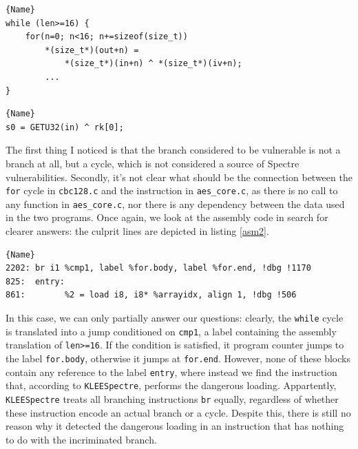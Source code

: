 \documentclass[12pt,a4paper]{book}
\theoremstyle{definition}
\begin{document}
	\lstset{
		numbers=left
	}
	\begin{minipage}{.7\textwidth}
		\begin{lstlisting}[caption=\texttt{cbc128.c}, firstnumber=92, label=cbc128]{Name}
while (len>=16) {
	for(n=0; n<16; n+=sizeof(size_t))
		*(size_t*)(out+n) = 
			*(size_t*)(in+n) ^ *(size_t*)(iv+n);
		...
}
		\end{lstlisting}
	\end{minipage}

	\begin{minipage}{.5\textwidth}
		\begin{lstlisting}[caption=\texttt{aes\_core.c}, firstnumber=797, label=aes-core2]{Name}
s0 = GETU32(in) ^ rk[0];
		\end{lstlisting}
	\end{minipage}
	\vspace{3mm}

	The first thing I noticed is that the branch considered to be vulnerable is not a branch at all, but a cycle, which is not considered a source of Spectre vulnerabilities. Secondly, it's not clear what should be the connection between the \texttt{for} cycle in \texttt{cbc128.c} and the instruction in \texttt{aes\_core.c}, as there is no call to any function in \texttt{aes\_core.c}, nor there is any dependency between the data used in the two programs. Once again, we look at the assembly code in search for clearer answers: the culprit lines are depicted in listing \ref{asm2}.
	
	\lstset{
		numbers=none
	}
	\begin{minipage}{.9\textwidth}
	\begin{lstlisting}[caption=\texttt{assembly.ll} (for AES-CBC), label=asm2]{Name}
2202: br i1 %cmp1, label %for.body, label %for.end, !dbg !1170
825:  entry:  
861:  		%2 = load i8, i8* %arrayidx, align 1, !dbg !506

	\end{lstlisting}
	\end{minipage}
	\vspace{3mm}

	In this case, we can only partially answer our questions: clearly, the \texttt{while} cycle is translated into a jump conditioned on \texttt{cmp1}, a label containing the assembly translation of \texttt{len>=16}. If the condition is satisfied, it program counter jumps to the label \texttt{for.body}, otherwise it jumps at \texttt{for.end}. However, none of these blocks contain any reference to the label \texttt{entry}, where instead we find the instruction that, according to \texttt{KLEESpectre}, performs the dangerous loading. Appartently, \texttt{KLEESpectre} treats all branching instructions \texttt{br} equally, regardless of whether these instruction encode an actual branch or a cycle. Despite this, there is still no reason why it detected the dangerous loading in an instruction that has nothing to do with the incriminated branch. 
\end{document}
